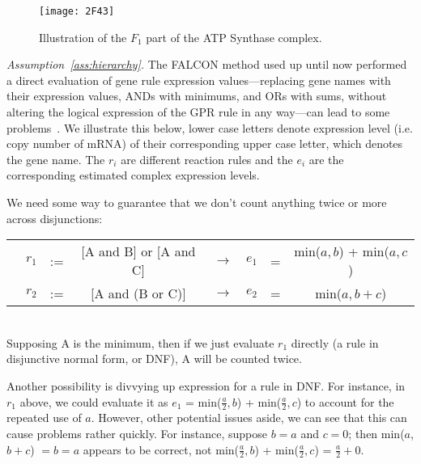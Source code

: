 \begin{methods}
\begin{figure}[H]
\caption{Illustration of the $F_1$ part of the ATP Synthase complex.}
\label{fig:2F43}
\centering
\texttt{[image: 2F43]}
\end{figure}

\emph{Assumption~\ref{ass:hierarchy}.}
The FALCON method used up until now performed a direct evaluation of
gene rule expression values---replacing gene names with their
expression values, ANDs with minimums, and ORs with sums, without
altering the logical expression of the GPR rule in any way---can lead
to some problems~\cite{Lee2012}. We illustrate this below, lower case
letters denote expression level (i.e. copy number of mRNA) of their
corresponding upper case letter, which denotes the gene name. The
$r_i$ are different reaction rules and the $e_i$ are the corresponding
estimated complex expression levels.

We need some way to guarantee that we don’t count anything twice or
more across disjunctions: \\
\begin{tabular}{cccccccc}
& $r_1$ & := & [A and B] or [A and C] & $\rightarrow$ & $e_1$  &=& min($a,b$) + min($a,c$) \\ 
& $r_2$ & := & [A and (B or C)]       & $\rightarrow$ & $e_2$  &=&  min($a, b + c$) 
\end{tabular} \\
Supposing A is the minimum, then if we just evaluate $r_1$ directly (a
rule in disjunctive normal form, or DNF), A will be counted twice.

Another possibility is divvying up expression for a rule in DNF. For
instance, in $r_1$ above, we could evaluate it as $e_1$ =
min($\frac{a}{2},b$) + min($\frac{a}{2},c$) to account for the
repeated use of $a$. However, other potential issues aside, we can see
that this can cause problems rather quickly. For instance, suppose $b
= a$ and $c = 0$; then min($a$,$b+c$) $=b=a$ appears to be correct,
not min($\frac{a}{2},b$) + min($\frac{a}{2},c$) = $\frac{a}{2} + 0$.


\end{methods}
